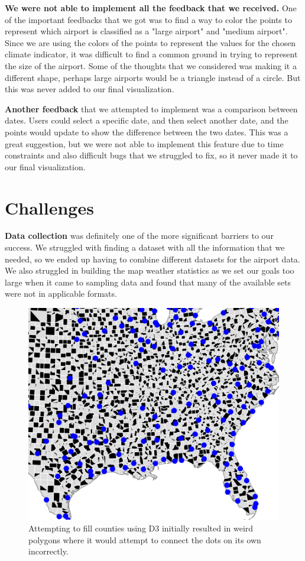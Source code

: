 \documentclass[10pt,twocolumn,twoside]{opticajnl}
\begin{document}
\textbf{We were not able to implement all the feedback that we received.} One of the important feedbacks that we got was to find a way to color the points to represent which airport is classified as a "large airport" and "medium airport". Since we are using the colors of the points to represent the values for the chosen climate indicator, it was difficult to find a common ground in trying to represent the size of the airport. Some of the thoughts that we considered was making it a different shape, perhaps large airports would be a triangle instead of a circle. But this was never added to our final visualization.

\textbf{Another feedback} that we attempted to implement was a comparison between dates. Users could select a specific date, and then select another date, and the points would update to show the difference between the two dates. This was a great suggestion, but we were not able to implement this feature due to time constraints and also difficult bugs that we struggled to fix, so it never made it to our final visualization.

\section {Challenges}

\textbf{Data collection} was definitely one of the more significant barriers to our success. We struggled with finding a dataset with all the information that we needed, so we ended up having to combine different datasets for the airport data. We also struggled in building the map weather statistics as we set our goals too large when it came to sampling data and found that many of the available sets were not in applicable formats.

\begin{figure}
	\centering
	\includegraphics[scale=0.5]{images/countiesBroken.png}
	\caption{Attempting to fill counties using D3 initially resulted in weird polygons where it would attempt to connect the dots on its own incorrectly.}
\end{figure}
\end{document}
